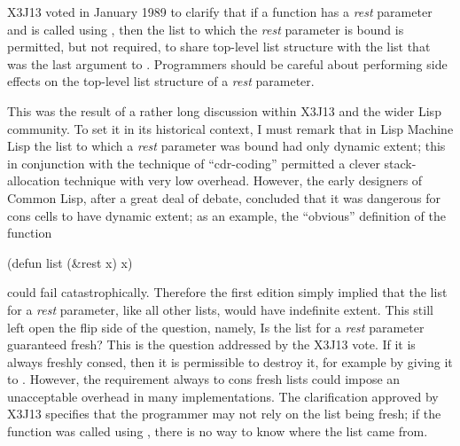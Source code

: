 \begin{new}
X3J13 voted in January 1989
to clarify that if a function has a \textit{rest} parameter
and is called using , then the list to which the
\textit{rest} parameter is bound is permitted, but not required,
to share top-level list structure with the list that was the last
argument to .  Programmers should be careful about performing
side effects on the top-level list structure of a \textit{rest} parameter.

This was the result of a rather long discussion within X3J13 and the
wider Lisp community.  To set it in its historical context, I must remark
that in Lisp Machine Lisp the list to which a \textit{rest} parameter was
bound had only dynamic extent; this in conjunction with the
technique of ``cdr-coding'' permitted a clever stack-allocation technique
with very low overhead.  However, the early designers of
Common Lisp, after a great deal of debate, concluded that it was dangerous
for cons cells to have dynamic extent; as an example, the ``obvious''
definition of the function 
\begin{lisp}
(defun list (\&rest x) x)
\end{lisp}
could fail catastrophically.  Therefore the first edition simply implied
that the list for a \textit{rest} parameter, like all other lists, would
have indefinite extent.  This still left open the flip side of the
question, namely, Is the list for a \textit{rest} parameter guaranteed fresh?
This is the question addressed by the X3J13 vote.
If it is always freshly consed, then it is permissible to destroy it,
for example by giving it to .  However, the requirement always
to cons fresh lists could impose an unacceptable overhead in many implementations.
The clarification approved by X3J13 specifies that the programmer may
not rely on the list being fresh; if the function was called using ,
there is no way to know where the list came from.
\end{new}

